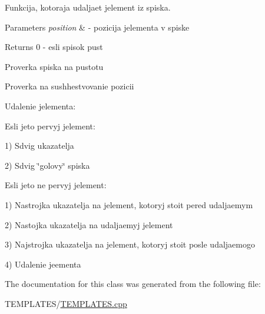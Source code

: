Funkcija, kotoraja udaljaet jelement iz spiska. 


\begin{DoxyParams}{Parameters}
{\em position} & -\/ pozicija jelementa v spiske \\
\hline
\end{DoxyParams}
\begin{DoxyReturn}{Returns}
0 -\/ esli spisok pust 
\end{DoxyReturn}
Proverka spiska na pustotu

Proverka na sushhestvovanie pozicii

Udalenie jelementa\+:


\begin{DoxyItemize}
\item Esli jeto pervyj jelement\+:
\end{DoxyItemize}

1) Sdvig ukazatelja

2) Sdvig \char`\"{}golovy\char`\"{} spiska


\begin{DoxyItemize}
\item Esli jeto ne pervyj jelement\+:
\end{DoxyItemize}

1) Nastrojka ukazatelja na jelement, kotoryj stoit pered udaljaemym

2) Nastojka ukazatelja na udaljaemyj jelement

3) Najstrojka ukazatelja na jelement, kotoryj stoit posle udaljaemogo

4) Udalenie jeementa 

The documentation for this class was generated from the following file\+:\begin{DoxyCompactItemize}
\item 
T\+E\+M\+P\+L\+A\+T\+E\+S/\hyperlink{_t_e_m_p_l_a_t_e_s_8cpp}{T\+E\+M\+P\+L\+A\+T\+E\+S.\+cpp}\end{DoxyCompactItemize}
